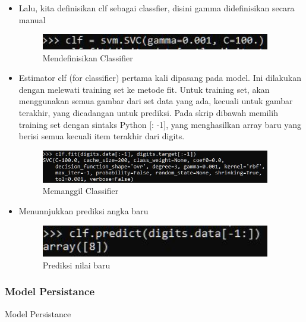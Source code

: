 \begin{itemize}
\item Lalu, kita definisikan clf sebagai classfier, disini gamma didefinisikan secara manual
\begin{figure}[H]
	\begin{center}
   	 \includegraphics[width=10cm]{figures/1174066/1/8.jpg}
   	 \caption{Mendefinisikan Classifier}	
	\end{center}
\end{figure}

\item Estimator clf (for classifier) pertama kali dipasang pada model. Ini dilakukan dengan melewati training set ke metode fit. Untuk training set, akan menggunakan semua gambar dari set data yang ada, kecuali untuk gambar terakhir, yang dicadangan untuk prediksi. Pada skrip dibawah memilih training set dengan sintaks Python [: -1], yang menghasilkan array baru yang berisi semua kecuali item terakhir dari digits.
\begin{figure}[H]
	\begin{center}
   	 \includegraphics[width=10cm]{figures/1174066/1/9.jpg}
   	 \caption{Memanggil Classifier}	
	\end{center}
\end{figure}

\item Menunnjukkan prediksi angka baru
\begin{figure}[H]
	\begin{center}
   	 \includegraphics[width=10cm]{figures/1174066/1/10.jpg}
   	 \caption{Prediksi nilai baru}	
	\end{center}
\end{figure}
\end{itemize}


\subsubsection{Model Persistance}
Model Persistance


